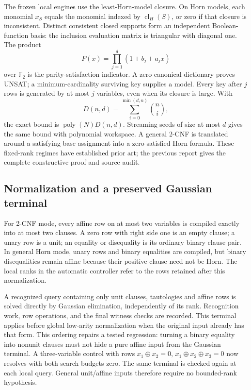 \documentclass[11pt]{article}
\newcommand{\F}{\mathbb F_2}
\newcommand{\poly}{\operatorname{poly}}
\newcommand{\cl}{\operatorname{cl}}
\begin{document}
The frozen local engines use the least-Horn-model closure. On Horn models,
each monomial \(x_S\) equals the monomial indexed by \(\cl_H(S)\), or zero
if that closure is inconsistent. Distinct consistent closed supports form an
independent Boolean-function basis: the inclusion evaluation matrix is
triangular with diagonal one. The product
\[
 P(x)=\prod_{j=1}^{d}(1+b_j+a_jx)
\]
over \(\F\) is the parity-satisfaction indicator. A zero canonical
dictionary proves UNSAT; a minimum-cardinality surviving key supplies a model.
Every key after \(j\) rows is generated by at most \(j\) variables, even
when its closure is large. With
\[
 D(n,d)=\sum_{i=0}^{\min(d,n)}\binom ni,
\]
the exact bound is \(\poly(N)D(n,d)\). Streaming seeds of size at most
\(d\) gives the same bound with polynomial workspace. A general 2-CNF is
translated around a satisfying base assignment into a zero-satisfied Horn
formula. These fixed-rank regimes have established prior art; the previous
report gives the complete constructive proof and source audit.

\subsection*{Normalization and a preserved Gaussian terminal}
For 2-CNF mode, every affine row on at most two variables is compiled exactly
into at most two clauses. A zero row with right side one is an empty clause;
a unary row is a unit; an equality or disequality is its ordinary binary
clause pair. In general Horn mode, unary rows and binary equalities are
compiled, but binary disequalities remain affine because their positive
clause need not be Horn. The local ranks in the automatic controller refer
to the rows retained after this normalization.

A recognized query containing only unit clauses, tautologies and affine
rows is solved directly by Gaussian elimination, independently of its rank.
Recognition work, row operations, and the final witness checks are recorded.
This terminal applies before global low-arity normalization when the original
input already has that form. This ordering repairs a tested regression:
turning a binary equality into nonunit clauses must not hide a pure affine
input from the Gaussian terminal. A three-variable control with rows
\(x_1\oplus x_2=0\), \(x_1\oplus x_2\oplus x_3=0\) now resolves with
both search budgets zero. The same terminal is checked again at each local
query. General unit/affine inputs therefore require no bounded-rank hypothesis.
\end{document}
